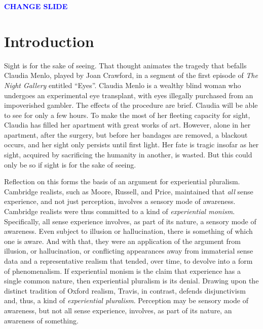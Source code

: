 \documentclass[12pt]{article}
\newcommand{\change}{\textcolor{blue}{\textbf{CHANGE SLIDE}}}
\begin{document}
\maketitle

\setlength{\parindent}{1em}

\change

\section{Introduction} %
\label{sec:introduction}

Sight is for the sake of seeing. That thought animates the tragedy that befalls Claudia Menlo, played by Joan Crawford, in a segment of the first episode of \emph{The Night Gallery} entitled ``Eyes''. Claudia Menlo is a wealthy blind woman who undergoes an experimental eye transplant, with eyes illegally purchased from an impoverished gambler. The effects of the procedure are brief. Claudia will be able to see for only a few hours. To make the most of her fleeting capacity for sight, Claudia has filled her apartment with great works of art. However, alone in her apartment, after the surgery, but before her bandages are removed, a blackout occurs, and her sight only persists until first light. Her fate is tragic insofar as her sight, acquired by sacrificing the humanity in another, is wasted. But this could only be so if sight is for the sake of seeing.

Reflection on this forms the basis of an argument for experiential pluralism. Cambridge realists, such as Moore, Russell, and Price, maintained that \emph{all} sense experience, and not just perception, involves a sensory mode of awareness. Cambridge realists were thus committed to a kind of \emph{experiential monism}. Specifically, all sense experience involves, as part of its nature, a sensory mode of awareness. Even subject to illusion or hallucination, there is something of which one is aware. And with that, they were an application of the argument from illusion, or hallucination, or conflicting appearances away from immaterial sense data and a representative realism that tended, over time, to devolve into a form of phenomenalism. If experiential monism is the claim that experience has a single common nature, then experiential pluralism is its denial. Drawing upon the distinct tradition of Oxford realism, Travis, in contrast, defends disjunctivism and, thus, a kind of \emph{experiential pluralism}. Perception may be sensory mode of awareness, but not all sense experience, involves, as part of its nature, an awareness of something. 
\end{document}

